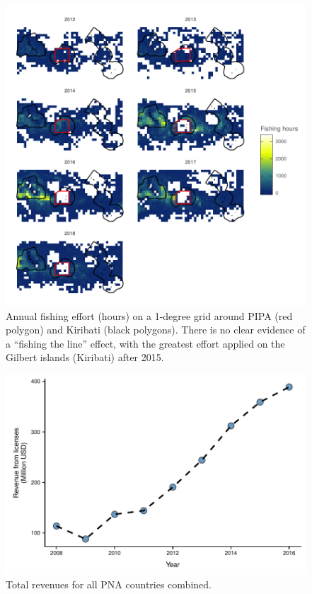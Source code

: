 \documentclass[12pt]{article}
\begin{document}
\begin{figure}
\centering
	\includegraphics{img/fishing_the_line_by_year.pdf}
	\caption{\label{fig:fishing_the_line_by_year}Annual fishing effort (hours) on a 1-degree grid around PIPA (red polygon) and Kiribati (black polygons). There is no clear evidence of a ``fishing the line'' effect, with the greatest effort applied on the Gilbert islands (Kiribati) after 2015.}	
\end{figure}

\begin{figure}
\centering
	\includegraphics{img/total_PNA_revenues.pdf}
	\caption{\label{fig:total_PNA_revenues}Total revenues for all PNA countries combined.}
\end{figure}
\end{document}
